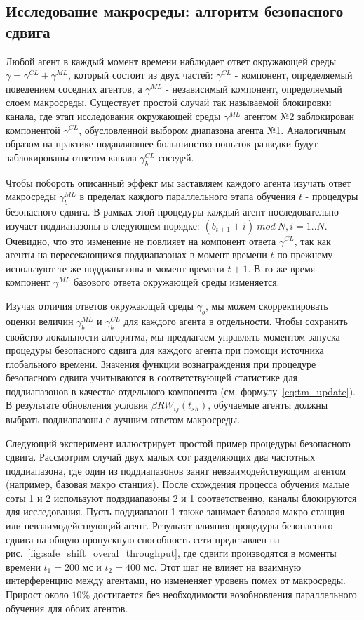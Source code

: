 \subsection{Исследование макросреды: алгоритм безопасного сдвига}
\label{sec:safe_shift}
Любой агент в каждый момент времени наблюдает ответ окружающей среды $\gamma = \gamma^{CL} + \gamma^{ML}$, который состоит из двух частей: $\gamma^{CL}$ - компонент, определяемый поведением соседних агентов, а $\gamma^{ML}$ - независимый компонент, определяемый слоем макросреды.
Существует простой случай так называемой блокировки канала, где этап исследования окружающей среды $\gamma^{ML}$ агентом №2 заблокирован компонентой $\gamma^{CL}$, обусловленной выбором диапазона агента №1. Аналогичным образом на практике подавляющее большинство попыток разведки будут заблокированы ответом канала $\gamma_b^{CL}$ соседей.

Чтобы побороть описанный эффект мы заставляем каждого агента изучать ответ макросреды $\gamma_b^{ML}$ в пределах каждого параллельного этапа обучения $t$ - процедуры безопасного сдвига. В рамках этой процедуры каждый агент последовательно изучает поддиапазоны в следующем порядке: ${(b_{t+1}+i)~mod~N}, i=1..N$. Очевидно, что это изменение не повлияет на компонент ответа $\gamma^{CL}$, так как агенты на пересекающихся поддиапазонах в момент времени $t$ по-прежнему используют те же поддиапазоны в момент времени ${t+1}$. В то же время компонент $\gamma^{ML}$ базового ответа окружающей среды изменяется.

Изучая отличия ответов окружающей среды $\gamma_b$, мы можем скорректировать оценки величин $\gamma_b^{ML}$ и $\gamma_b^{CL}$ для каждого агента в отдельности. Чтобы сохранить свойство локальности алгоритма, мы предлагаем управлять моментом запуска процедуры безопасного сдвига для каждого агента при помощи источника глобального времени. Значения функции вознаграждения при процедуре безопасного сдвига учитываются в соответствующей статистике для поддиапазонов в качестве отдельного компонента (см. формулу~\ref{eq:tm_update}). В результате обновления условия $\beta RW_{ij}(t_{sh})$, обучаемые агенты должны выбрать поддиапазоны с лучшим ответом макросреды.

Следующий эксперимент иллюстрирует простой пример процедуры безопасного сдвига. Рассмотрим случай двух малых сот разделяющих два частотных поддиапазона, где один из поддиапазонов занят невзаимодействующим агентом (например, базовая макро станция). После схождения процесса обучения малые соты 1 и 2 используют подздиапазоны 2 и 1 соответственно, каналы блокируются для исследования. Пусть поддиапазон 1 также занимает базовая макро станция или невзаимодействующий агент. Результат влияния процедуры безопасного сдвига на общую пропускную способность сети представлен на рис.~\ref{fig:safe_shift_overal_throughput}, где сдвиги производятся в моменты времени $t_1=200$ мс и $t_2=400$ мс. Этот шаг не влияет на взаимную интерференцию между агентами, но измененяет уровень помех от макросреды. Прирост около $10\%$ достигается без необходимости возобновления параллельного обучения для обоих агентов.

